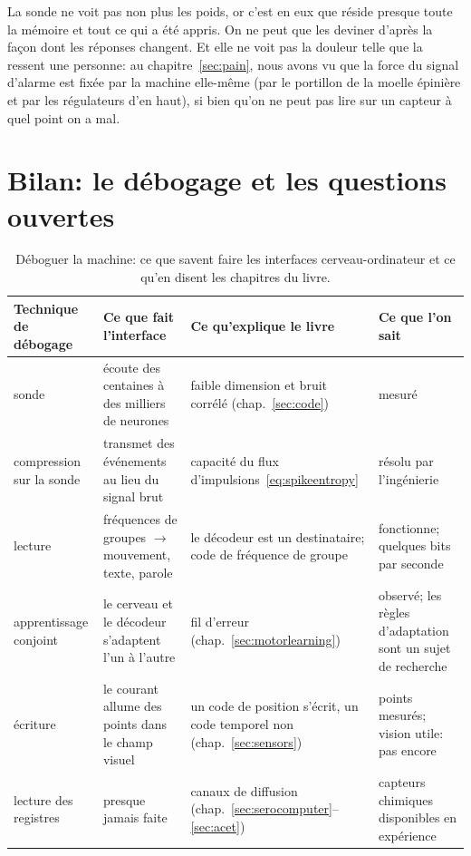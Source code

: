 La sonde ne voit pas non plus les poids, or c'est en eux que réside presque toute la mémoire et tout ce qui a été appris. On ne peut que les deviner d'après la façon dont les réponses changent. Et elle ne voit pas la douleur telle que la ressent une personne: au chapitre~\ref{sec:pain}, nous avons vu que la force du signal d'alarme est fixée par la machine elle-même (par le portillon de la moelle épinière et par les régulateurs d'en haut), si bien qu'on ne peut pas lire sur un capteur à quel point on a mal.

\section{Bilan: le débogage et les questions ouvertes}

\begin{table}[t]
\centering
\footnotesize
\setlength{\tabcolsep}{4pt}
\renewcommand{\arraystretch}{1.15}
\begin{tabular}{>{\raggedright}p{2.2cm}>{\raggedright}p{3.6cm}>{\raggedright}p{3.4cm}>{\raggedright\arraybackslash}p{4.0cm}}
\toprule
Technique de débogage & Ce que fait l'interface & Ce qu'explique le livre & Ce que l'on sait \\
\midrule
sonde & écoute des centaines à des milliers de neurones & faible dimension et bruit corrélé (chap.~\ref{sec:code}) & mesuré \\
compression sur la sonde & transmet des événements au lieu du signal brut & capacité du flux d'impulsions~\eqref{eq:spikeentropy} & résolu par l'ingénierie \\
lecture & fréquences de groupes $\to$ mouvement, texte, parole & le décodeur est un destinataire; code de fréquence de groupe & fonctionne; quelques bits par seconde \\
apprentissage conjoint & le cerveau et le décodeur s'adaptent l'un à l'autre & fil d'erreur (chap.~\ref{sec:motorlearning}) & observé; les règles d'adaptation sont un sujet de recherche \\
écriture & le courant allume des points dans le champ visuel & un code de position s'écrit, un code temporel non (chap.~\ref{sec:sensors}) & points mesurés; vision utile: pas encore \\
lecture des registres & presque jamais faite & canaux de diffusion (chap.~\ref{sec:serocomputer}--\ref{sec:acet}) & capteurs chimiques disponibles en expérience \\
\bottomrule
\end{tabular}
\caption{Déboguer la machine: ce que savent faire les interfaces cerveau-ordinateur et ce qu'en disent les chapitres du livre.}
\label{tab:debugging}
\end{table}

